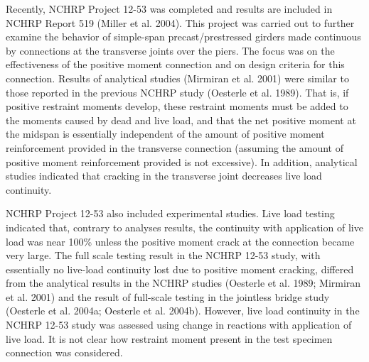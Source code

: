 Recently, NCHRP Project 12-53 was completed and results are included in NCHRP Report 519 (Miller et al. 2004). This project was carried out to further examine the behavior of simple-span precast/prestressed girders made continuous by connections at the transverse joints over the piers. The focus was on the effectiveness of the positive moment connection and on design criteria for this connection. Results of analytical studies (Mirmiran et al. 2001) were similar to those reported in the previous NCHRP study (Oesterle et al. 1989). That is, if positive restraint moments develop, these restraint moments must be added to the moments caused by dead and live load, and that the net positive moment at the midspan is essentially independent of the amount of positive moment reinforcement provided in the transverse connection (assuming the amount of positive moment reinforcement provided is not excessive). In addition, analytical studies indicated that cracking in the transverse joint decreases live load continuity.

NCHRP Project 12-53 also included experimental studies. Live load testing indicated that, contrary to analyses results, the continuity with application of live load was near 100\% unless the positive moment crack at the connection became very large. The full scale testing result in the NCHRP 12-53 study, with essentially no live-load continuity lost due to positive moment cracking, differed from the analytical results in the NCHRP studies (Oesterle et al. 1989; Mirmiran et al. 2001) and the result of full-scale testing in the jointless bridge study (Oesterle et al. 2004a; Oesterle et al. 2004b). However, live load continuity in the NCHRP 12-53 study was assessed using change in reactions with application of live load. It is not clear how restraint moment present in the test specimen connection was considered.

